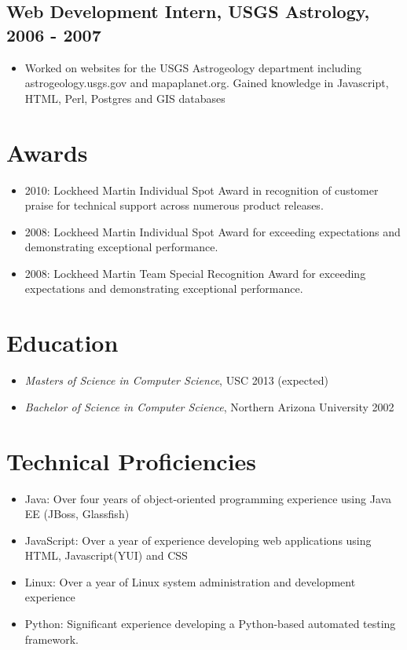 \documentclass[11pt]{article}
\begin{document}
\subsection*{Web Development Intern, USGS Astrology, 2006 - 2007}
\label{sec-1.2}

\begin{itemize}
\item Worked on websites for the USGS Astrogeology department including astrogeology.usgs.gov and mapaplanet.org. Gained knowledge in Javascript, HTML, Perl, Postgres and GIS databases
\end{itemize}
\section*{Awards}
\label{sec-2}

\begin{itemize}
\item 2010: Lockheed Martin Individual Spot Award in recognition of customer praise for technical support across numerous product releases.
\item 2008: Lockheed Martin Individual Spot Award for exceeding expectations and demonstrating exceptional performance.
\item 2008: Lockheed Martin Team Special Recognition Award for exceeding expectations and demonstrating exceptional performance.
\end{itemize}
\section*{Education}
\label{sec-3}

\begin{itemize}
\item \emph{Masters of Science in Computer Science}, USC 2013 (expected)
\item \emph{Bachelor of Science in Computer Science}, Northern Arizona University 2002
\end{itemize}
\section*{Technical Proficiencies}
\label{sec-4}

\begin{itemize}
\item Java: Over four years of object-oriented programming experience using Java EE (JBoss, Glassfish)
\item JavaScript: Over a year of experience developing web applications using HTML, Javascript(YUI) and CSS
\item Linux: Over a year of Linux system administration and development experience
\item Python: Significant experience developing a Python-based automated testing framework.
\end{itemize}
\end{document}
